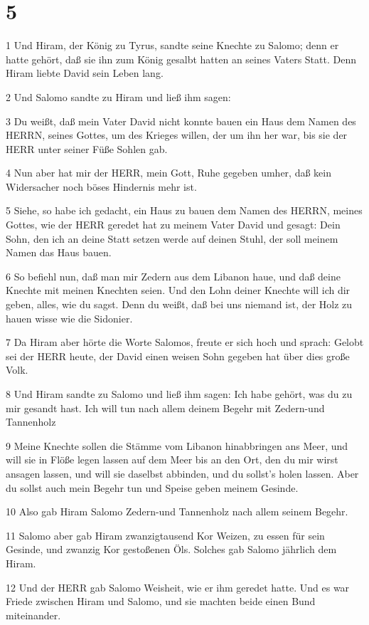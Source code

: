 \chapter{5}

\par 1 Und Hiram, der König zu Tyrus, sandte seine Knechte zu Salomo; denn er hatte gehört, daß sie ihn zum König gesalbt hatten an seines Vaters Statt. Denn Hiram liebte David sein Leben lang.
\par 2 Und Salomo sandte zu Hiram und ließ ihm sagen:
\par 3 Du weißt, daß mein Vater David nicht konnte bauen ein Haus dem Namen des HERRN, seines Gottes, um des Krieges willen, der um ihn her war, bis sie der HERR unter seiner Füße Sohlen gab.
\par 4 Nun aber hat mir der HERR, mein Gott, Ruhe gegeben umher, daß kein Widersacher noch böses Hindernis mehr ist.
\par 5 Siehe, so habe ich gedacht, ein Haus zu bauen dem Namen des HERRN, meines Gottes, wie der HERR geredet hat zu meinem Vater David und gesagt: Dein Sohn, den ich an deine Statt setzen werde auf deinen Stuhl, der soll meinem Namen das Haus bauen.
\par 6 So befiehl nun, daß man mir Zedern aus dem Libanon haue, und daß deine Knechte mit meinen Knechten seien. Und den Lohn deiner Knechte will ich dir geben, alles, wie du sagst. Denn du weißt, daß bei uns niemand ist, der Holz zu hauen wisse wie die Sidonier.
\par 7 Da Hiram aber hörte die Worte Salomos, freute er sich hoch und sprach: Gelobt sei der HERR heute, der David einen weisen Sohn gegeben hat über dies große Volk.
\par 8 Und Hiram sandte zu Salomo und ließ ihm sagen: Ich habe gehört, was du zu mir gesandt hast. Ich will tun nach allem deinem Begehr mit Zedern-und Tannenholz
\par 9 Meine Knechte sollen die Stämme vom Libanon hinabbringen ans Meer, und will sie in Flöße legen lassen auf dem Meer bis an den Ort, den du mir wirst ansagen lassen, und will sie daselbst abbinden, und du sollst's holen lassen. Aber du sollst auch mein Begehr tun und Speise geben meinem Gesinde.
\par 10 Also gab Hiram Salomo Zedern-und Tannenholz nach allem seinem Begehr.
\par 11 Salomo aber gab Hiram zwanzigtausend Kor Weizen, zu essen für sein Gesinde, und zwanzig Kor gestoßenen Öls. Solches gab Salomo jährlich dem Hiram.
\par 12 Und der HERR gab Salomo Weisheit, wie er ihm geredet hatte. Und es war Friede zwischen Hiram und Salomo, und sie machten beide einen Bund miteinander.
